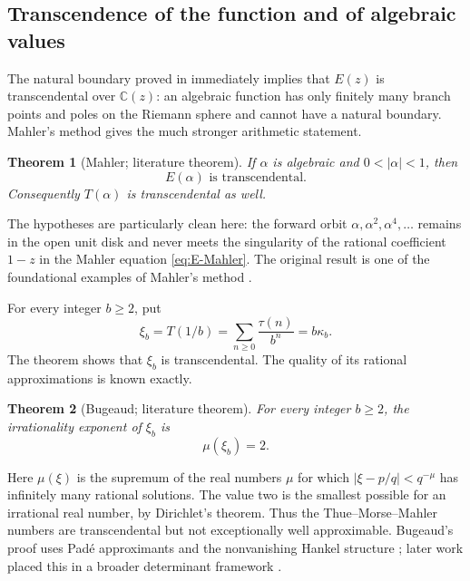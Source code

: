 \documentclass[11pt,oneside]{article}
\newtheorem{theorem}{Theorem}[section]
\theoremstyle{definition}
\theoremstyle{remark}
\newcommand{\C}{\mathbb C}
\begin{document}
\subsection{Transcendence of the function and of algebraic values}

The natural boundary proved in  immediately implies that \(E(z)\) is
transcendental over \(\C(z)\): an algebraic function has only finitely many branch points and
poles on the Riemann sphere and cannot have a natural boundary.  Mahler's method gives the
much stronger arithmetic statement.

\begin{theorem}[Mahler; literature theorem]
\label{thm:Mahler-values}
If \(\alpha\) is algebraic and \(0<|\alpha|<1\), then
\begin{equation}
  \boxed{E(\alpha)\text{ is transcendental}.}              \label{eq:Mahler-value}
\end{equation}
Consequently \(T(\alpha)\) is transcendental as well.
\end{theorem}

The hypotheses are particularly clean here: the forward orbit
\(\alpha,\alpha^2,\alpha^4,\ldots\) remains in the open unit disk and never meets the
singularity of the rational coefficient \(1-z\) in the Mahler equation
\eqref{eq:E-Mahler}.  The original result is one of the foundational examples of Mahler's
method \cite{mahler1929}.

For every integer \(b\ge2\), put
\begin{equation}
  \xi_b=T(1/b)=\sum_{n\ge0}\frac{\tau(n)}{b^n}=b\kappa_b.  \label{eq:xi-b}
\end{equation}
The theorem shows that \(\xi_b\) is transcendental.  The quality of its rational
approximations is known exactly.

\begin{theorem}[Bugeaud; literature theorem]
\label{thm:irrationality-exponent}
For every integer \(b\ge2\), the irrationality exponent of \(\xi_b\) is
\begin{equation}
  \boxed{\mu(\xi_b)=2.}                                    \label{eq:irrationality-exponent}
\end{equation}
\end{theorem}

Here \(\mu(\xi)\) is the supremum of the real numbers \(\mu\) for which
\(|\xi-p/q|<q^{-\mu}\) has infinitely many rational solutions.  The value two is the
smallest possible for an irrational real number, by Dirichlet's theorem.  Thus the
Thue--Morse--Mahler numbers are transcendental but not exceptionally well approximable.
Bugeaud's proof uses Pad\'e approximants and the nonvanishing Hankel structure
\cite{bugeaud2011}; later work placed this in a broader determinant framework
\cite{bugeaudhanwenyao2015}.
\end{document}
